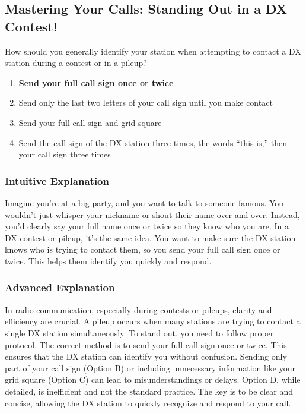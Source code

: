 \subsection{Mastering Your Calls: Standing Out in a DX Contest!}

\begin{tcolorbox}[colback=gray!10!white,colframe=black!75!black,title=E2C11] How should you generally identify your station when attempting to contact a DX station during a contest or in a pileup?
    \begin{enumerate}[label=\Alph*.]
        \item \textbf{Send your full call sign once or twice}
        \item Send only the last two letters of your call sign until you make contact
        \item Send your full call sign and grid square
        \item Send the call sign of the DX station three times, the words “this is,” then your call sign three times
    \end{enumerate}
\end{tcolorbox}

\subsubsection{Intuitive Explanation}
Imagine you're at a big party, and you want to talk to someone famous. You wouldn't just whisper your nickname or shout their name over and over. Instead, you'd clearly say your full name once or twice so they know who you are. In a DX contest or pileup, it's the same idea. You want to make sure the DX station knows who is trying to contact them, so you send your full call sign once or twice. This helps them identify you quickly and respond.

\subsubsection{Advanced Explanation}
In radio communication, especially during contests or pileups, clarity and efficiency are crucial. A pileup occurs when many stations are trying to contact a single DX station simultaneously. To stand out, you need to follow proper protocol. The correct method is to send your full call sign once or twice. This ensures that the DX station can identify you without confusion. Sending only part of your call sign (Option B) or including unnecessary information like your grid square (Option C) can lead to misunderstandings or delays. Option D, while detailed, is inefficient and not the standard practice. The key is to be clear and concise, allowing the DX station to quickly recognize and respond to your call.

